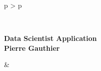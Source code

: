 \documentclass[cv]{cv_style}
\begin{document}

{
	\begin{tabular}{p{\topleftsize\textwidth} > {\arraybackslash}p{\toprightsize\textwidth}}
\vspace{-.2cm}
\begin{minipage}[t]{\topleftsize\textwidth}
    \vspace{-.1cm} \\
        \begin{minipage}{0.85\textwidth}
\begin{flushright}
                \Large


		\textbf{\color{blue2} Data Scientist Application} \\
                {\textbf{Pierre \hspace{.1cm}Gauthier}}
            \end{flushright}
        \end{minipage}
\end{minipage}
& 
\begin{minipage}[t]{\toprightsize\textwidth}
\vspace{0.5cm}
             \\
            \vspace{.1cm}
             \\
\end{minipage}\\
\end{tabular}
}
\end{document}
